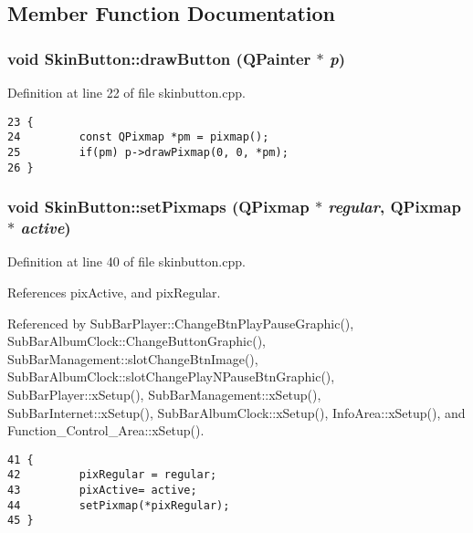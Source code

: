 \subsection{Member Function Documentation}
\subsubsection{\setlength{\rightskip}{0pt plus 5cm}void Skin\-Button::draw\-Button (QPainter $\ast$ {\em p})\hspace{0.3cm}{\tt  [protected, virtual]}}\label{classSkinButton_SkinButtonb0}




Definition at line 22 of file skinbutton.cpp.



\footnotesize\begin{verbatim}23 {
24         const QPixmap *pm = pixmap();
25         if(pm) p->drawPixmap(0, 0, *pm);
26 }
\end{verbatim}\normalsize 
{}
\subsubsection{\setlength{\rightskip}{0pt plus 5cm}void Skin\-Button::set\-Pixmaps (QPixmap $\ast$ {\em regular}, QPixmap $\ast$ {\em active})}\label{classSkinButton_SkinButtona2}




Definition at line 40 of file skinbutton.cpp.

References pix\-Active, and pix\-Regular.

Referenced by Sub\-Bar\-Player::Change\-Btn\-Play\-Pause\-Graphic(), Sub\-Bar\-Album\-Clock::Change\-Button\-Graphic(), Sub\-Bar\-Management::slot\-Change\-Btn\-Image(), Sub\-Bar\-Album\-Clock::slot\-Change\-Play\-NPause\-Btn\-Graphic(), Sub\-Bar\-Player::x\-Setup(), Sub\-Bar\-Management::x\-Setup(), Sub\-Bar\-Internet::x\-Setup(), Sub\-Bar\-Album\-Clock::x\-Setup(), Info\-Area::x\-Setup(), and Function\_\-Control\_\-Area::x\-Setup().



\footnotesize\begin{verbatim}41 {
42         pixRegular = regular; 
43         pixActive= active; 
44         setPixmap(*pixRegular); 
45 }
\end{verbatim}\normalsize 
{}
